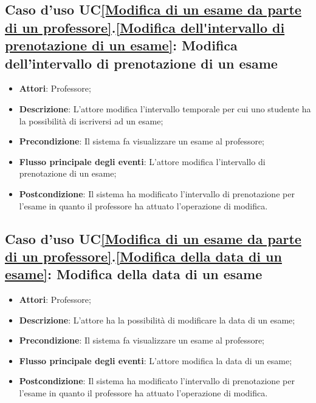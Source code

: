 \subsection{Caso d'uso UC\ref{Modifica di un esame da parte di un professore}.\ref{Modifica dell'intervallo di prenotazione di un esame}: Modifica dell'intervallo di prenotazione di un esame}
\begin{itemize}
	\item \textbf{Attori}: Professore;
	\item \textbf{Descrizione}: L'attore modifica l'intervallo temporale per cui uno studente ha la possibilità di iscriversi ad un esame;
	\item \textbf{Precondizione}: Il sistema fa visualizzare un esame al professore;
	
	
	\item \textbf{Flusso principale degli eventi}: L'attore modifica l'intervallo di prenotazione di un esame;
	\item \textbf{Postcondizione}: Il sistema ha modificato l'intervallo di prenotazione per l'esame in quanto il professore ha attuato l'operazione di modifica.
	
\end{itemize}

\subsection{Caso d'uso UC\ref{Modifica di un esame da parte di un professore}.\ref{Modifica della data di un esame}: Modifica della data di un esame}
\begin{itemize}
	\item \textbf{Attori}: Professore;
	\item \textbf{Descrizione}: L'attore ha la possibilità di modificare la data di un esame;
	\item \textbf{Precondizione}: Il sistema fa visualizzare un esame al professore;
	
	\item \textbf{Flusso principale degli eventi}: L'attore modifica la data di un esame;
	\item \textbf{Postcondizione}: Il sistema ha modificato l'intervallo di prenotazione per l'esame in quanto il professore ha attuato l'operazione di modifica.
	
\end{itemize}

